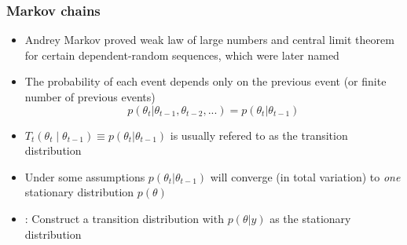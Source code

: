 \documentclass[10pt]{beamer}
\begin{document}
\begin{frame}

\frametitle{Markov chains}

  \begin{itemize}
  \item<1-> Andrey Markov proved weak law of large numbers and central
    limit theorem for certain dependent-random sequences, which were
    later named 
  \item<2-> The probability of each event depends only on the previous event (or finite number of previous events)
    \[
    p(\theta_t|\theta_{t-1}, \theta_{t-2}, ...) = p(\theta_t|\theta_{t-1})
    \]
    \item<3-> $T_t(\theta_{t} \mid \theta_{t-1}) \equiv p(\theta_t|\theta_{t-1})$ is usually refered to as the {\color{uured} transition distribution}
    \item<4-> Under some assumptions $p(\theta_t|\theta_{t-1})$ will converge (in total variation) to \emph{one} {\color{uured} stationary distribution} $p(\theta)$
    \item<5-> : Construct a {\color{uured} transition distribution} with $p(\theta|y)$ as the {\color{uured} stationary distribution}
  \end{itemize}

\end{frame}




%
%
\end{document}
